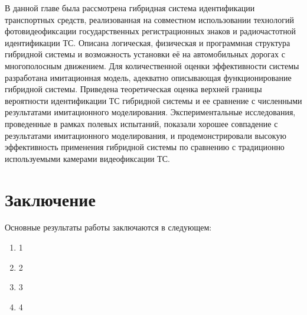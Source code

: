 \documentclass[12pt]{article}
\theoremstyle{definition}
\begin{document}
В данной главе была рассмотрена гибридная система идентификации транспортных средств, реализованная на совместном использовании технологий фотовидеофиксации государственных регистрационных знаков и радиочастотной идентификации ТС. Описана логическая, физическая и программная структура гибридной системы и возможность установки её на автомобильных дорогах с многополосным движением. Для количественной оценки эффективности системы разработана имитационная модель, адекватно описывающая функционирование гибридной системы. Приведена теоретическая оценка верхней границы вероятности идентификации ТС гибридной системы и ее сравнение с численными результатами имитационного моделирования. Экспериментальные исследования, проведенные в рамках полевых испытаний, показали хорошее совпадение с результатами имитационного моделирования, и продемонстрировали высокую эффективность применения гибридной системы по сравнению с традиционно используемыми камерами видеофиксации ТС.

\section*{Заключение}
Основные результаты работы заключаются в следующем:

\begin{enumerate}
    \item 1
    \item 2
    \item 3
    \item 4
\end{enumerate}

\setlength{\itemsep}{0em}
\small

\end{document}
